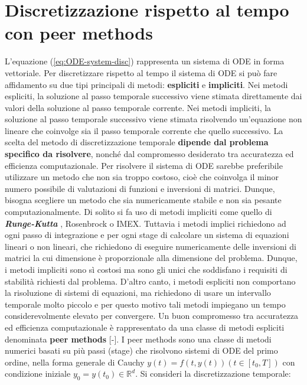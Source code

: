 \section{Discretizzazione rispetto al tempo con peer methods} \label{sec:time-discretization}
\noindent L'equazione (\ref{eq:ODE-system-disc}) rappresenta un sistema di ODE in forma vettoriale. Per discretizzare rispetto al tempo il sistema di ODE si può fare affidamento su due tipi principali di metodi: \textbf{espliciti} e \textbf{impliciti}. Nei metodi espliciti, la soluzione al passo temporale successivo viene stimata direttamente dai valori della soluzione al passo temporale corrente. Nei metodi impliciti, la soluzione al passo temporale successivo viene stimata risolvendo un'equazione non lineare che coinvolge sia il passo temporale corrente che quello successivo.
La scelta del metodo di discretizzazione temporale \textbf{dipende dal problema specifico da risolvere}, nonché dal compromesso desiderato tra accuratezza ed efficienza computazionale. \noindent Per risolvere il sistema di ODE sarebbe preferibile utilizzare un metodo che non sia troppo costoso, cioè che coinvolga il minor numero possibile di valutazioni di funzioni e inversioni di matrici. Dunque, bisogna scegliere un metodo che sia numericamente stabile e non sia pesante computazionalmente. \noindent Di solito si fa uso di metodi impliciti come quello di \textit{\textbf{Runge-Kutta}} \cite{implicit-runge-kutta, implicit-runge-kutta-2}, Rosenbrock o IMEX.
\noindent Tuttavia i metodi implici richiedono ad ogni passo di integrazione e per ogni stage di calcolare un sistema di equazioni lineari o non lineari, che richiedono di eseguire numericamente delle inversioni di matrici la cui dimensione è proporzionale alla dimensione del problema. Dunque, i metodi impliciti sono sì costosi ma sono gli unici che soddisfano i requisiti di stabilità richiesti dal problema. D'altro canto, i metodi espliciti non comportano la risoluzione di sistemi di equazioni, ma richiedono di usare un intervallo temporale molto piccolo e per questo motivo tali metodi impiegano un tempo considerevolmente elevato per convergere.
Un buon compromesso tra accuratezza ed efficienza computazionale è rappresentato da una classe di metodi espliciti denominata \textbf{peer methods} [\cite{peer-methods-1}-\cite{peer-methods-10}].
I peer methods sono una classe di metodi numerici basati su più passi (stage) che risolvono sistemi di ODE del primo ordine, nella forma generale di Cauchy $y(t) = f(t,y(t)) (t \in [t_0,T])$ con condizione iniziale $y_0 = y(t_0) \in \mathbb{R}^d$. Si consideri la discretizzazione temporale:

